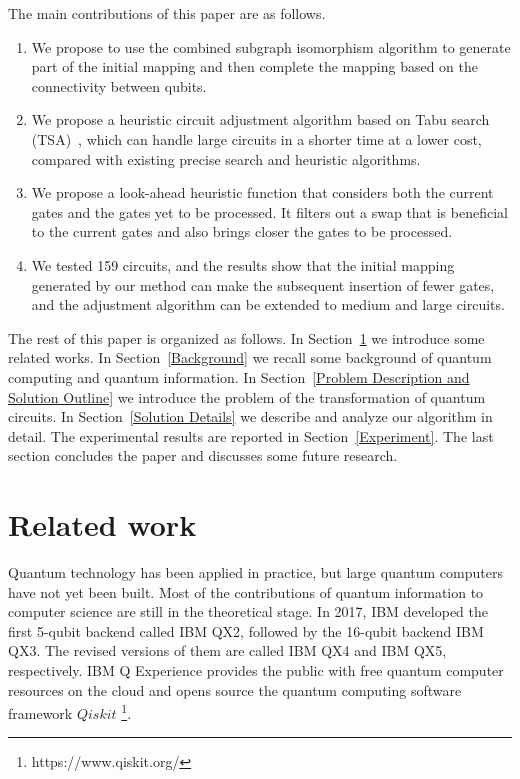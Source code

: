 \documentclass[runningheads]{llncs}
\begin{document}
The main contributions of this paper are as follows.
	\begin{enumerate}
	\item We propose to use the combined subgraph isomorphism algorithm to generate part of the initial mapping
    and then complete the mapping based on the connectivity between qubits.
	\item We propose a heuristic circuit adjustment algorithm based on Tabu search (TSA)~\cite{Glover1990}, which can handle large circuits in a shorter time at a lower cost, compared with existing precise search and heuristic algorithms.
	\item  We propose a look-ahead heuristic function that considers both the current gates and the  gates yet to be processed. It filters out a swap that is beneficial to the current gates and also brings closer the gates to be processed.
	\item We tested 159 circuits, and the results show that the initial mapping generated by our method can make the subsequent insertion of fewer gates, and the adjustment algorithm can be extended to medium and large circuits.
	\end{enumerate}

The rest of this paper is organized as follows.
In Section~\ref{Related work} we introduce some related works. 
In Section~\ref{Background} we recall some background of quantum computing and quantum information. In Section~\ref{Problem Description and Solution Outline}
we introduce the problem of the transformation of quantum circuits.
In Section~\ref{Solution Details} we describe and analyze our algorithm in detail.
The experimental results are reported in Section~\ref{Experiment}. 
The last section concludes the paper and discusses some future research.

\section{Related work}
\label{Related work}
Quantum technology has been applied in practice, but large quantum computers have not yet been built. Most of the contributions of quantum information to computer science are still in the theoretical stage. In 2017, IBM developed the first 5-qubit backend called IBM QX2, followed by the 16-qubit backend  IBM QX3. The revised versions of them are called IBM QX4 and IBM QX5, respectively. IBM Q Experience provides the public with free quantum computer resources on the cloud and opens source the quantum computing software framework $Qiskit$ \footnote{https://www.qiskit.org/}. 
\end{document}
